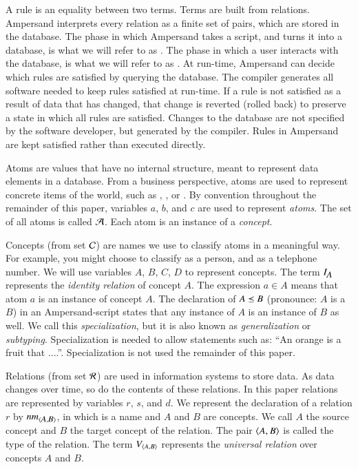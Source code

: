 \documentclass{elsarticle}
\begin{document}
	A rule is an equality between two terms.
	Terms are built from relations.
	Ampersand interprets every relation as a finite set of pairs, which are stored in the database.
	The phase in which Ampersand takes a script, and turns it into a database, is what we will refer to as .
	The phase in which a user interacts with the database, is what we will refer to as .
	At run-time, Ampersand can decide which rules are satisfied by querying the database.
	The compiler generates all software needed to keep rules satisfied at run-time.
	If a rule is not satisfied as a result of data that has changed, that change is reverted (rolled back) to
	preserve a state in which all rules are satisfied.
	Changes to the database are not specified by the software developer, but generated by the compiler.
	Rules in Ampersand are kept satisfied rather than executed directly.
	
	Atoms are values that have no internal structure, meant to represent data elements in a database.
	From a business perspective, atoms are used to represent concrete items of the world,
	such as , , or .
	By convention throughout the remainder of this paper, variables $a$, $b$, and $c$ are used to represent \emph{atoms}.
	The set of all atoms is called $\mathcal{A}$.
        Each atom is an instance of a \emph{concept}.

	Concepts (from set $\mathcal{C}$) are names we use to classify atoms in a meaningful way.
	For example, you might choose to classify  as a person, and  as a telephone number.
        We will use variables $A$, $B$, $C$, $D$ to represent concepts.
	The term $I_{\text{\em \small A\/}}$ represents the \emph{identity relation} of concept $A$.
	The expression $a \in A$ means that atom $a$ is an instance of concept $A$.
	The declaration of $A\preceq B$ (pronounce: $A$ is a $B$)
	in an Ampersand-script states that any instance of $A$ is an instance of $B$ as well.
	We call this {\em specialization}, but it is also known as {\em generalization} or {\em subtyping}.
	Specialization is needed to allow statements such as: ``An orange is a fruit that ....''.
	Specialization is not used the remainder of this paper.

	Relations (from set $\mathcal{R}$) are used in information systems to store data.
	As data changes over time, so do the contents of these relations.
	In this paper relations are represented by variables $r$, $s$, and $d$.
	We represent the declaration of a relation $r$ by $\text{\em nm\/}_{\langle{\text{\em \small A\/}},{\text{\em \small B\/}}\rangle}$,
	in which  is a name and $A$ and $B$ are concepts.
	We call $A$ the source concept and $B$ the target concept of the relation.
	The pair $\langle{A},{B}\rangle$ is called the type of the relation.
	The term $V_{\langle{A},{B}\rangle}$ represents the \emph{universal relation} over concepts $A$ and $B$.
\end{document}

